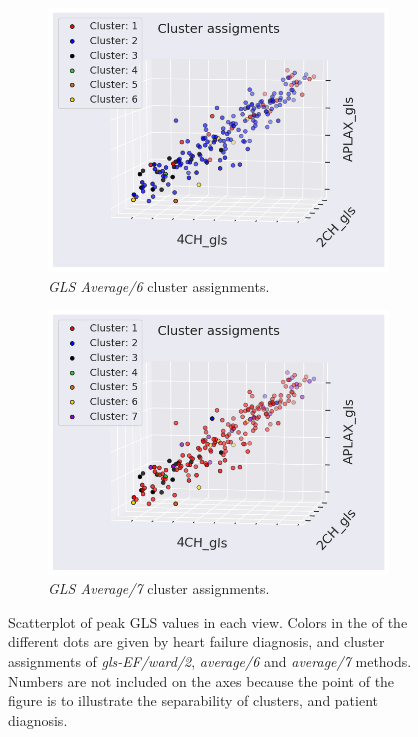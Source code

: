 \begin{figure}[H]
    \begin{subfigure}[b]{0.49\textwidth}
        \centering
        \includegraphics[width=0.99\textwidth]{results/pd/scatter_gls_average6.png}
        \caption{\textit{GLS Average/6} cluster assignments.}
        \label{fig:scatter_gls_ef_complete2}
    \end{subfigure}
    \begin{subfigure}[b]{0.49\textwidth}
        \centering
        \includegraphics[width=0.99\textwidth]{results/pd/scatter_gls_average7.png}
        \caption{\textit{GLS Average/7} cluster assignments.}
        \label{fig:scatter_gls_ef_average2}
    \end{subfigure}
    \caption{Scatterplot of peak GLS values in each view. Colors in the of the different dots are given by heart failure diagnosis, and cluster assignments of 
             \textit{gls-EF/ward/2}, \textit{average/6} and \textit{average/7} methods. Numbers are not included on the axes because the point of the figure is to illustrate the separability 
             of clusters, and patient diagnosis.}
             \label{fig:scatter_gls_ef_hf_cluster_assignments}
\end{figure}

